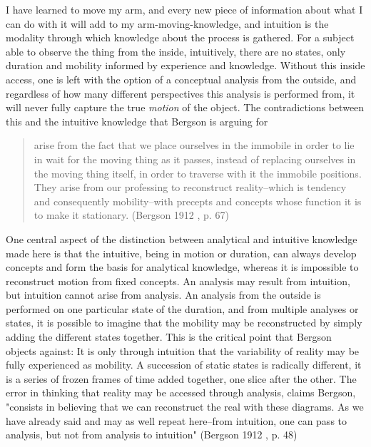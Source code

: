 \documentclass[11pt]{article}
\makeatletter
\newcommand{\cslcitation}[2]
 {\protect\hyper@linkstart{cite}{citeproc_bib_item_#1}#2\hyper@linkend}
\makeatother
\begin{document}
I have learned to move my arm, and every new piece of information about what I can do with it will add to my arm-moving-knowledge, and intuition is the modality through which knowledge about the process is gathered.
For a subject able to observe the thing from the inside, intuitively, there are no states, only duration and mobility informed by experience and knowledge.  
Without this inside access, one is left with the option of a conceptual analysis from the outside, and regardless of how many different perspectives this analysis is performed from, it will never fully capture the true \emph{motion} of the object.
The contradictions between this and the intuitive knowledge that Bergson is arguing for
\begin{quote}
arise from the fact that we place ourselves in the immobile in order to lie in wait for the moving thing as it passes, instead of replacing ourselves in the moving thing itself, in order to traverse with it the immobile positions. They arise from our professing to reconstruct reality--which is tendency and consequently mobility--with precepts and concepts whose function it is to make it stationary. (\cslcitation{2}{Bergson 1912} , p. 67)
\end{quote}

One central aspect of the distinction between analytical and intuitive knowledge made here is that the intuitive, being in motion or duration, can always develop concepts and form the basis for analytical knowledge, whereas it is impossible to reconstruct motion from fixed concepts.
An analysis may result from intuition, but intuition cannot arise from analysis.
An analysis from the outside is performed on one particular state of the duration, and from multiple analyses or states, it is possible to imagine that the mobility may be reconstructed by simply adding the different states together.
This is the critical point that Bergson objects against:
It is only through intuition that the variability of reality may be fully experienced as mobility.
A succession of static states is radically different, it is a series of frozen frames of time added together, one slice after the other.
The error in thinking that reality may be accessed through analysis, claims Bergson, "consists in believing that we can reconstruct the real with these diagrams. As we have already said and may as well repeat here--from intuition, one can pass to analysis, but not from analysis to intuition" (\cslcitation{2}{Bergson 1912} , p. 48) 
\end{document}

